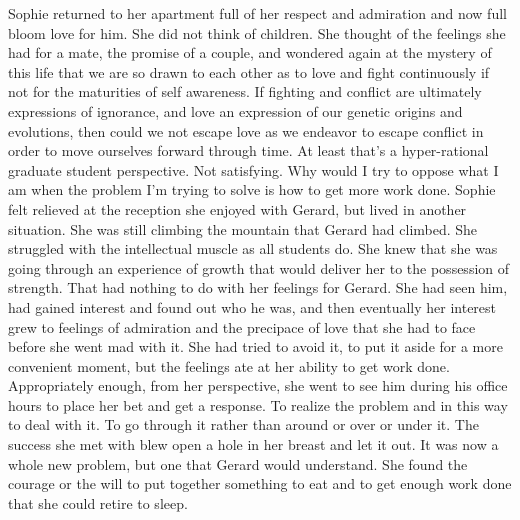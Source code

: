 

Sophie returned to her apartment full of her respect and admiration
and now full bloom love for him.  She did not think of children.  She
thought of the feelings she had for a mate, the promise of a couple,
and wondered again at the mystery of this life that we are so drawn to
each other as to love and fight continuously if not for the maturities
of self awareness.  If fighting and conflict are ultimately
expressions of ignorance, and love an expression of our genetic
origins and evolutions, then could we not escape love as we endeavor
to escape conflict in order to move ourselves forward through time.
At least that's a hyper-rational graduate student perspective.  Not
satisfying.  Why would I try to oppose what I am when the problem I'm
trying to solve is how to get more work done.  Sophie felt relieved at
the reception she enjoyed with Gerard, but lived in another situation.
She was still climbing the mountain that Gerard had climbed.  She
struggled with the intellectual muscle as all students do.  She knew
that she was going through an experience of growth that would deliver
her to the possession of strength.  That had nothing to do with her
feelings for Gerard.  She had seen him, had gained interest and found
out who he was, and then eventually her interest grew to feelings of
admiration and the precipace of love that she had to face before she
went mad with it.  She had tried to avoid it, to put it aside for a
more convenient moment, but the feelings ate at her ability to get
work done.  Appropriately enough, from her perspective, she went to
see him during his office hours to place her bet and get a response.
To realize the problem and in this way to deal with it.  To go through
it rather than around or over or under it.  The success she met with
blew open a hole in her breast and let it out.  It was now a whole new
problem, but one that Gerard would understand.  She found the courage
or the will to put together something to eat and to get enough work
done that she could retire to sleep.

\bye
